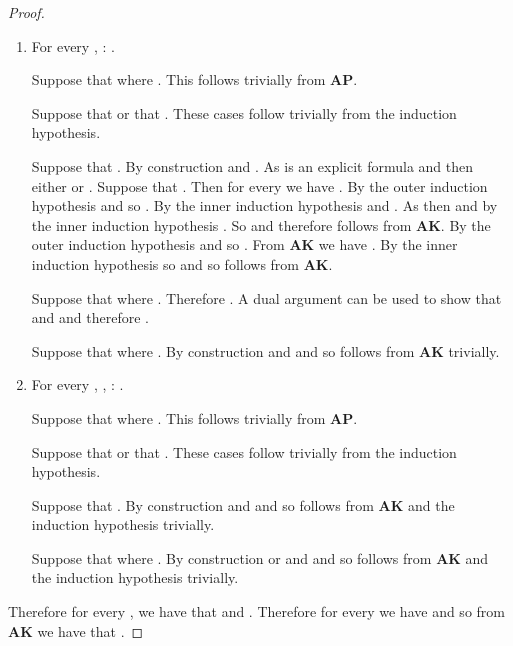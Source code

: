 \documentclass[twoside]{aiml14}
\begin{document}
\begin{proof}
\begin{enumerate}
          \item For every , : .

              Suppose that  where . 
              This follows trivially from {\bf AP}.

              Suppose that  or that . These cases follow trivially from the induction hypothesis.

              Suppose that .
              By construction  
              and .
              As  is an explicit formula and  
              then either  
              or .
              Suppose that .
              Then for every  
              we have .
              By the outer induction hypothesis  
              and so .
              By the inner induction hypothesis 
              and .
              As  then  
              and by the inner induction hypothesis .
              So  
              and therefore 
              follows from {\bf AK}.
              By the outer induction hypothesis  
              and so .
              From {\bf AK} we have .
              By the inner induction hypothesis  
              so 
              and so 
              follows from {\bf AK}.

              Suppose that  where .
              Therefore .
              A dual argument can be used to show that 
              and 
              and therefore .

              Suppose that  where .
              By construction 
              and  
              and so 
              follows from {\bf AK} trivially.

          \item For every , , : .

              Suppose that  where . 
              This follows trivially from {\bf AP}.

              Suppose that  or that . These cases follow trivially from the induction hypothesis.

              Suppose that .
              By construction 
              and 
              and so 
              follows from {\bf AK} and the induction hypothesis trivially.

              Suppose that  where .
              By construction 
              or 
              and 
              and so 
              follows from {\bf AK} and the induction hypothesis trivially.
      \end{enumerate}

      Therefore for every ,  
      we have that  
      and .
      Therefore for every  
      we have 
      and so from {\bf AK} we have that .


\end{proof}
\end{document}
